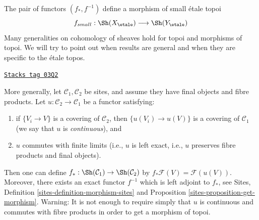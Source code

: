 The pair of functors $(f_*, f^{-1})$ define a morphism of small \'etale topoi
$$
f_{small} :
\Sh(X_\etale)
\longrightarrow
\Sh(Y_\etale)
$$
Many generalities on cohomology of sheaves hold for topoi and
morphisms of topoi. We will try to point out when results are
general and when they are specific to the \'etale topos.

\begin{remark}
\label{etale-cohomology-remark-functoriality-general}
\href{https://stacks.math.columbia.edu/tag/03Q2}{\texttt{Stacks tag 03Q2}}

More generally, let $\mathcal{C}_1, \mathcal{C}_2$ be sites, and
assume they have final objects and fibre products. Let
$u: \mathcal{C}_2 \to \mathcal{C}_1$ be a functor satisfying:
\begin{enumerate}
\item if $\{V_i \to V\}$ is a covering of $\mathcal{C}_2$, then
$\{u(V_i) \to u(V)\}$ is a covering of $\mathcal{C}_1$ (we
say that $u$ is {\it continuous}), and
\item $u$ commutes with finite limits (i.e., $u$ is left exact, i.e.,
$u$ preserves fibre products and final objects).
\end{enumerate}
Then one can define
$f_*: \Sh(\mathcal{C}_1) \to \Sh(\mathcal{C}_2)$
by $ f_* \mathcal{F}(V) = \mathcal{F}(u(V))$.
Moreover, there exists an exact functor $f^{-1}$ which
is left adjoint to $f_*$, see
Sites, Definition \ref{sites-definition-morphism-sites} and
Proposition \ref{sites-proposition-get-morphism}.
Warning: It is not enough to require simply that $u$ is continuous
and commutes with fibre products in order to get a morphism of topoi.
\end{remark}

